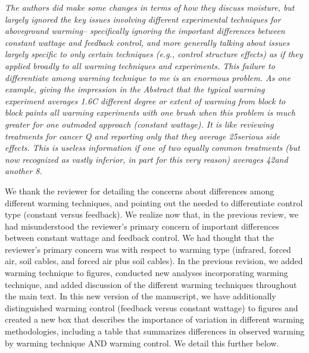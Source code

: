 \documentclass[11pt,a4paper]{letter}
\begin{document}
\begin{letter}{}
\par \emph{The authors did make some changes in terms of how they discuss moisture, but largely ignored the key issues involving different experimental techniques for aboveground warming-- specifically ignoring the important differences between constant wattage and feedback control, and more generally talking about issues largely specific to only certain techniques (e.g., control structure effects) as if they applied broadly to all warming techniques and experiments. This failure to differentiate among warming technique to me is an enormous problem. As one example, giving the impression in the Abstract that the typical warming experiment averages 1.6C different degree or extent of warming from block to block paints all warming experiments with one brush when this problem is much greater for one outmoded approach (constant
wattage). It is like reviewing treatments for cancer Q and reporting only that they average 25\percent serious side effects. This is useless information if one of two equally common treatments (but now recognized as vastly inferior, in part for this very reason) averages 42\percent and another 8\percent.}
\par We thank the reviewer for detailing the concerns about differences among different warming techniques, and pointing out the needed to differentiate control type (constant versus feedback). We realize now that, in the previous review, we had misunderstood the reviewer's primary concern of important differences between constant wattage and feedback control. We had thought that the reviewer's primary concern was with respect to warming type (infrared, forced air, soil cables, and forced air plus soil cables). In the previous revision, we added warming technique to figures, conducted new analyses incorporating warming technique, and added discussion of the different warming techniques throughout the main text.  In this new version of the manuscript, we have additionally distinguished warming control (feedback versus constant wattage) to figures and created a new box that describes the importance of variation in different warming methodologies, including a table that summarizes differences in observed warming by warming technique AND warming control. We detail this further below.
 

\end{letter}
\end{document}
